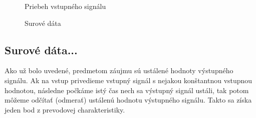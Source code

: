\documentclass[a4paper, 10pt, ]{article}
\begin{document}
\begin{figure}[!t]
	\centering


	\caption{Priebeh vstupného signálu}
	\label{Priebeh vstupného signálu}

\end{figure}















\begin{figure}[!b]
	\centering



	\caption{Surové dáta}
	\label{Surové dáta}

\end{figure}






\subsection{Surové dáta...}

Ako už bolo uvedené, predmetom záujmu sú ustálené hodnoty výstupného signálu. Ak na vstup privedieme vstupný signál s nejakou konštantnou vstupnou hodnotou, následne počkáme istý čas nech sa výstupný signál ustáli, tak potom môžeme odčítať (odmerať) ustálenú hodnotu výstupného signálu. Takto sa získa jeden bod z prevodovej charakteristiky.
\end{document}
